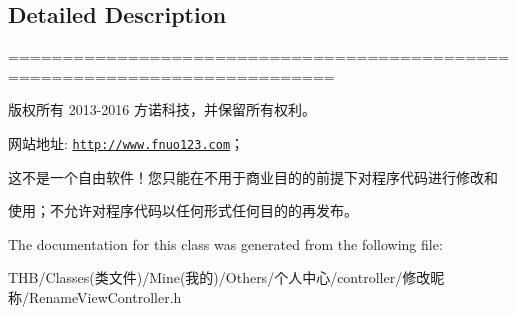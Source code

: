 \subsection{Detailed Description}
============================================================================

版权所有 2013-\/2016 方诺科技，并保留所有权利。

网站地址\+: \href{http://www.fnuo123.com}{\tt http\+://www.\+fnuo123.\+com}； 



这不是一个自由软件！您只能在不用于商业目的的前提下对程序代码进行修改和

使用；不允许对程序代码以任何形式任何目的的再发布。 

 

The documentation for this class was generated from the following file\+:\begin{DoxyCompactItemize}
\item 
T\+H\+B/\+Classes(类文件)/\+Mine(我的)/\+Others/个人中心/controller/修改昵称/Rename\+View\+Controller.\+h\end{DoxyCompactItemize}
